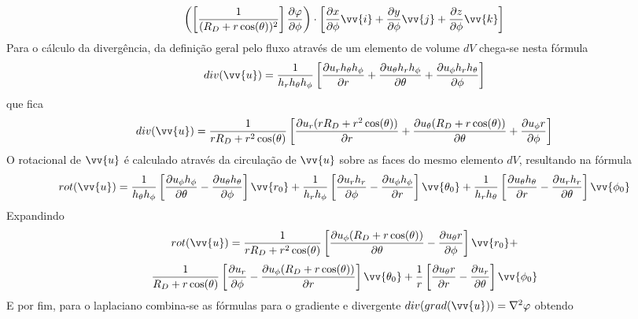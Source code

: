 \documentclass[12pt,oneside,a4paper]{abntex2}
\begin{document}
\begin{equation*}
\left( \left[ \frac{1}{ (R_D + r \cos(\theta))^2}\right] \dfrac{\partial \varphi}{\partial \phi}\right) \cdot \left[ \dfrac{\partial x}{\partial \phi}\vv{i} + \dfrac{\partial y}{\partial \phi}\vv{j} + \dfrac{\partial z}{\partial \phi}\vv{k} \right]
\end{equation*}
Para o cálculo da divergência, da definição geral pelo fluxo através de um elemento de volume $dV$ chega-se nesta fórmula
\begin{equation}
div(\vv{u}) = \frac{1}{h_r h_\theta h_\phi} \left[ \dfrac{\partial u_r h_\theta h_\phi}{\partial r} + \dfrac{\partial u_\theta h_r h_\phi}{\partial \theta} +  \dfrac{\partial u_\phi h_r h_\theta}{\partial \phi} \right]
\end{equation}
que fica
\begin{equation}
div(\vv{u}) = \frac{1}{r R_D + r^2 \cos(\theta)} \left[ \dfrac{\partial u_r (r R_D + r^2 \cos(\theta))}{\partial r} + \dfrac{\partial u_\theta   (R_D + r \cos(\theta))}{\partial \theta} +  \dfrac{\partial u_\phi  r}{\partial \phi} \right]
\end{equation}
O rotacional de $\vv{u}$ é calculado através da circulação de $\vv{u}$ sobre as faces do mesmo elemento $dV$, resultando na fórmula
\begin{equation}
rot(\vv{u}) = \frac{1}{h_\theta h_\phi} \left[ \dfrac{\partial u_\phi  h_\phi}{\partial \theta} - \dfrac{\partial u_\theta  h_\theta}{\partial \phi} \right] \vv{r_0}+\frac{1}{h_r h_\phi} \left[ \dfrac{\partial u_r  h_r}{\partial \phi} - \dfrac{\partial u_\phi  h_\phi}{\partial r} \right] \vv{\theta_0}+\frac{1}{h_r h_\theta} \left[ \dfrac{\partial u_\theta  h_\theta}{\partial r} - \dfrac{\partial u_r  h_r}{\partial \theta}  \right] \vv{\phi_0}
\end{equation}
Expandindo
\begin{equation}
rot(\vv{u}) = \frac{1}{r R_D + r^2 \cos(\theta)} \left[ \dfrac{\partial u_\phi (R_D + r \cos(\theta))}{\partial \theta} - \dfrac{\partial u_\theta r}{\partial \phi} \right] \vv{r_0}+
\end{equation}
\begin{equation*}
\frac{1}{R_D + r \cos(\theta)} \left[ \dfrac{\partial u_r}{\partial \phi} - \dfrac{\partial u_\phi  (R_D + r \cos(\theta))}{\partial r} \right] \vv{\theta_0}+\frac{1}{r} \left[ \dfrac{\partial u_\theta  r}{\partial r} - \dfrac{\partial u_r}{\partial \theta}  \right] \vv{\phi_0}
\end{equation*}
E por fim, para o laplaciano combina-se as fórmulas para o gradiente e divergente $div(grad(\vv{u})) = \nabla^2 \varphi$ obtendo
\end{document}

